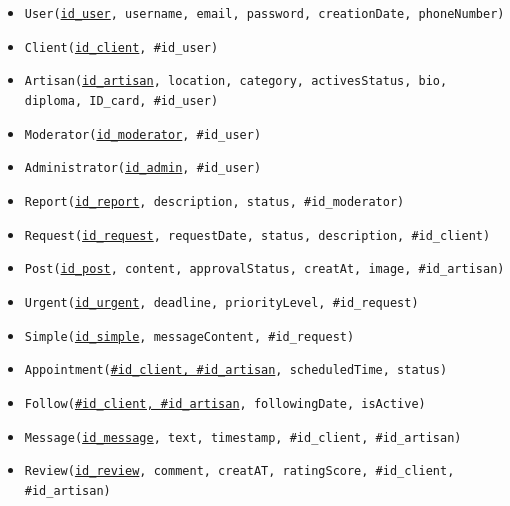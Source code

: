 \documentclass[12pt,a4paper]{report}
\begin{document}
\begin{itemize}[leftmargin=*, nosep]
    \item[] \texttt{User(\underline{id\_user}, username, email, password, creationDate, phoneNumber)}
    
    \vspace{6pt}
    \item[] \texttt{Client(\underline{id\_client}, \#id\_user)}
    
    \vspace{6pt}
    \item[] \texttt{Artisan(\underline{id\_artisan}, location, category, activesStatus, bio, diploma, ID\_card, \#id\_user)}
    
    \vspace{6pt}
    \item[] \texttt{Moderator(\underline{id\_moderator}, \#id\_user)}
    
    \vspace{6pt}
    \item[] \texttt{Administrator(\underline{id\_admin}, \#id\_user)}
    
    \vspace{6pt}
    \item[] \texttt{Report(\underline{id\_report}, description, status, \#id\_moderator)}
    
    \vspace{6pt}
    \item[] \texttt{Request(\underline{id\_request}, requestDate, status, description, \#id\_client)}
    
    \vspace{6pt}
    \item[] \texttt{Post(\underline{id\_post}, content, approvalStatus, creatAt, image, \#id\_artisan)}
    
    \vspace{6pt}
    \item[] \texttt{Urgent(\underline{id\_urgent}, deadline, priorityLevel, \#id\_request)}
    
    \vspace{6pt}
    \item[] \texttt{Simple(\underline{id\_simple}, messageContent, \#id\_request)}
    
    \vspace{6pt}
    \item[] \texttt{Appointment(\underline{\#id\_client, \#id\_artisan}, scheduledTime, status)}
    
    \vspace{6pt}
    \item[] \texttt{Follow(\underline{\#id\_client, \#id\_artisan}, followingDate, isActive)}
    
    \vspace{6pt}
    \item[] \texttt{Message(\underline{id\_message}, text, timestamp, \#id\_client, \#id\_artisan)}
    
    \vspace{6pt}
    \item[] \texttt{Review(\underline{id\_review}, comment, creatAT, ratingScore, \#id\_client, \#id\_artisan)}
\end{itemize}
\end{document}
